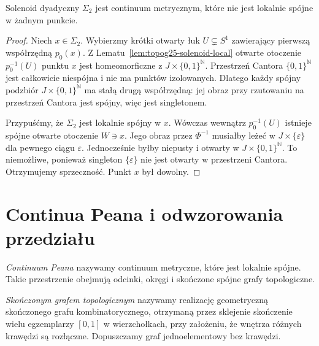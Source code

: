 \begin{twierdzenie}
\label{thm:topog25-solenoid-not-locally-connected}
Solenoid dyadyczny \(\Sigma_2\)
jest continuum metrycznym,
które nie jest lokalnie spójne
w żadnym punkcie.
\end{twierdzenie}
\begin{proof}
Niech \(x\in\Sigma_2\).
Wybierzmy krótki otwarty łuk
\(U\subsetneq S^1\) zawierający
pierwszą współrzędną \(p_0(x)\).
Z Lematu~\ref{lem:topog25-solenoid-local}
otwarte otoczenie
\(p_0^{-1}(U)\) punktu \(x\)
jest homeomorficzne
z \(J\times\{0,1\}^{\mathbb N}\).
Przestrzeń Cantora
\(\{0,1\}^{\mathbb N}\)
jest całkowicie niespójna
i nie ma punktów izolowanych.
Dlatego każdy spójny podzbiór
\(J\times\{0,1\}^{\mathbb N}\)
ma stałą drugą współrzędną:
jej obraz przy rzutowaniu
na przestrzeń Cantora jest spójny,
więc jest singletonem.

Przypuśćmy, że \(\Sigma_2\)
jest lokalnie spójny w \(x\).
Wówczas wewnątrz
\(p_0^{-1}(U)\) istnieje
spójne otwarte otoczenie \(W\ni x\).
Jego obraz przez \(\Phi^{-1}\)
musiałby leżeć w
\(J\times\{\varepsilon\}\)
dla pewnego ciągu \(\varepsilon\).
Jednocześnie byłby
niepusty i otwarty
w \(J\times\{0,1\}^{\mathbb N}\).
To niemożliwe, ponieważ
singleton \(\{\varepsilon\}\)
nie jest otwarty w przestrzeni Cantora.
Otrzymujemy sprzeczność.
Punkt \(x\) był dowolny.
\end{proof}

\section{Continua Peana i odwzorowania przedziału}
\label{sec:topog25-peano}

\begin{definicja}
\label{def:topog25-peano}
\emph{Continuum Peana} nazywamy
continuum metryczne,
które jest lokalnie spójne.
Takie przestrzenie obejmują
odcinki, okręgi i skończone
spójne grafy topologiczne.
\end{definicja}

\begin{definicja}
\label{def:topog25-finite-graph}
\emph{Skończonym grafem topologicznym}
nazywamy realizację geometryczną
skończonego grafu kombinatorycznego,
otrzymaną przez sklejenie
skończenie wielu egzemplarzy \([0,1]\)
w wierzchołkach, przy założeniu,
że wnętrza różnych krawędzi
są rozłączne.
Dopuszczamy graf jednoelementowy
bez krawędzi.
\end{definicja}

